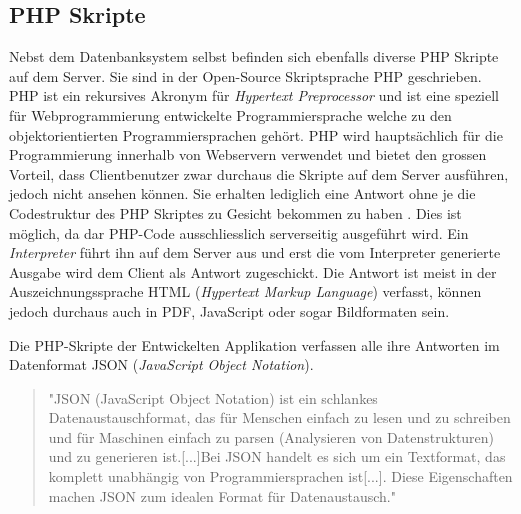 \documentclass[a4paper,11pt]{report}
\begin{document}
				
				\subsection{PHP Skripte} \label{ssec:PHP}
				Nebst dem Datenbanksystem selbst befinden sich ebenfalls diverse PHP Skripte auf dem Server. Sie sind in der Open-Source Skriptsprache PHP geschrieben. PHP ist ein rekursives Akronym für \emph{Hypertext Preprocessor} und ist eine speziell für Webprogrammierung entwickelte Programmiersprache welche zu den objektorientierten Programmiersprachen gehört. PHP wird hauptsächlich für die Programmierung innerhalb von Webservern verwendet und bietet den grossen Vorteil, dass Clientbenutzer zwar durchaus die Skripte auf dem Server ausführen, jedoch nicht ansehen können. Sie erhalten lediglich eine Antwort ohne je die Codestruktur des PHP Skriptes zu Gesicht bekommen zu haben \cite{PHP}. Dies ist möglich, da dar PHP-Code ausschliesslich serverseitig ausgeführt wird. Ein \emph{Interpreter} führt ihn auf dem Server aus und erst die vom Interpreter generierte Ausgabe wird dem Client als Antwort zugeschickt. Die Antwort ist meist in der Auszeichnungssprache HTML (\emph{Hypertext Markup Language}) verfasst, können jedoch durchaus auch in PDF, JavaScript oder sogar Bildformaten sein.\cite{PHP:function}
				
				Die PHP-Skripte der Entwickelten Applikation verfassen alle ihre Antworten im Datenformat JSON (\emph{JavaScript Object Notation}).
				\begin{quotation}
					"JSON (JavaScript Object Notation) ist ein schlankes Datenaustauschformat, das für Menschen einfach zu lesen und zu schreiben und für Maschinen einfach zu parsen (Analysieren von Datenstrukturen) und zu generieren ist.[...]Bei JSON handelt es sich um ein Textformat, das komplett unabhängig von Programmiersprachen ist[...]. Diese Eigenschaften machen JSON zum idealen Format für Datenaustausch."\cite{JSON}
				\end{quotation}
				
\end{document}
